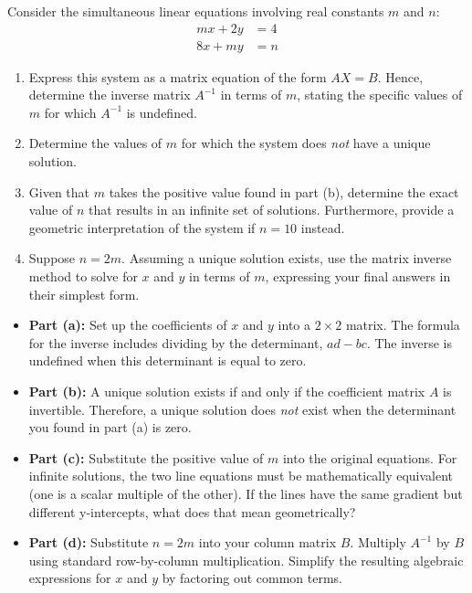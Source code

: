 \begin{problem}
Consider the simultaneous linear equations involving real constants $m$ and $n$:
\begin{align*}
mx + 2y &= 4 \\
8x + my &= n
\end{align*}

\begin{enumerate}[label=\textbf{(\alph*)}]
    \item Express this system as a matrix equation of the form $AX = B$. Hence, determine the inverse matrix $A^{-1}$ in terms of $m$, stating the specific values of $m$ for which $A^{-1}$ is undefined.
    \item Determine the values of $m$ for which the system does \textit{not} have a unique solution.
    \item Given that $m$ takes the positive value found in part (b), determine the exact value of $n$ that results in an infinite set of solutions. Furthermore, provide a geometric interpretation of the system if $n = 10$ instead.
    \item Suppose $n = 2m$. Assuming a unique solution exists, use the matrix inverse method to solve for $x$ and $y$ in terms of $m$, expressing your final answers in their simplest form.
\end{enumerate}
\end{problem}

\begin{hint}
\begin{itemize}
    \item \textbf{Part (a):} Set up the coefficients of $x$ and $y$ into a $2 \times 2$ matrix. The formula for the inverse includes dividing by the determinant, $ad - bc$. The inverse is undefined when this determinant is equal to zero.
    \item \textbf{Part (b):} A unique solution exists if and only if the coefficient matrix $A$ is invertible. Therefore, a unique solution does \textit{not} exist when the determinant you found in part (a) is zero.
    \item \textbf{Part (c):} Substitute the positive value of $m$ into the original equations. For infinite solutions, the two line equations must be mathematically equivalent (one is a scalar multiple of the other). If the lines have the same gradient but different y-intercepts, what does that mean geometrically?
    \item \textbf{Part (d):} Substitute $n = 2m$ into your column matrix $B$. Multiply $A^{-1}$ by $B$ using standard row-by-column multiplication. Simplify the resulting algebraic expressions for $x$ and $y$ by factoring out common terms.
\end{itemize}
\end{hint}

